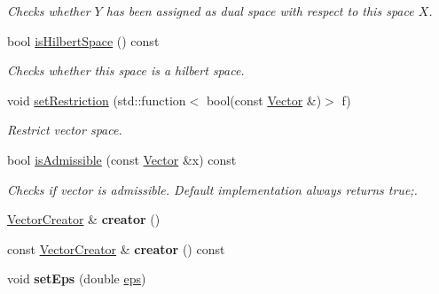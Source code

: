 \begin{DoxyCompactItemize}
\begin{DoxyCompactList}\small\item\em Checks whether $Y$ has been assigned as dual space with respect to this space $X$. \end{DoxyCompactList}\item 
\hypertarget{classSpacy_1_1VectorSpace_a12b023eff0cce202e4a5f9a754cc05c9}{}bool \hyperlink{classSpacy_1_1VectorSpace_a12b023eff0cce202e4a5f9a754cc05c9}{is\+Hilbert\+Space} () const \label{classSpacy_1_1VectorSpace_a12b023eff0cce202e4a5f9a754cc05c9}

\begin{DoxyCompactList}\small\item\em Checks whether this space is a hilbert space. \end{DoxyCompactList}\item 
void \hyperlink{classSpacy_1_1VectorSpace_a7c5f4a8c5937f9e07592483666b20ef7}{set\+Restriction} (std\+::function$<$ bool(const \hyperlink{classSpacy_1_1Vector}{Vector} \&)$>$ f)
\begin{DoxyCompactList}\small\item\em Restrict vector space. \end{DoxyCompactList}\item 
bool \hyperlink{classSpacy_1_1VectorSpace_a4beac78b082a364eb97e938b6c4928d2}{is\+Admissible} (const \hyperlink{classSpacy_1_1Vector}{Vector} \&x) const 
\begin{DoxyCompactList}\small\item\em Checks if vector is admissible. Default implementation always returns true;. \end{DoxyCompactList}\item 
\hypertarget{classSpacy_1_1VectorSpace_aa2a71d0d7fd79135b6d06c2fc7feb6ce}{}\hyperlink{namespaceSpacy_a94fc7a4b9d3b26ef835e61647fac4d9b}{Vector\+Creator} \& {\bfseries creator} ()\label{classSpacy_1_1VectorSpace_aa2a71d0d7fd79135b6d06c2fc7feb6ce}

\item 
\hypertarget{classSpacy_1_1VectorSpace_a7031996784f545979c2fb77b6190d427}{}const \hyperlink{namespaceSpacy_a94fc7a4b9d3b26ef835e61647fac4d9b}{Vector\+Creator} \& {\bfseries creator} () const \label{classSpacy_1_1VectorSpace_a7031996784f545979c2fb77b6190d427}

\item 
\hypertarget{classSpacy_1_1Mixin_1_1Eps_a1bbfd62541610d5d80f2782ab77158e4}{}void {\bfseries set\+Eps} (double \hyperlink{classSpacy_1_1Mixin_1_1Eps_a40e2ba8f3abd2b5370ef41238cfaaf8b}{eps})\label{classSpacy_1_1Mixin_1_1Eps_a1bbfd62541610d5d80f2782ab77158e4}


\end{DoxyCompactItemize}
